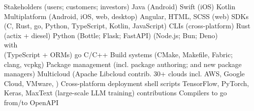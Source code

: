 \documentclass[11pt, a4paper]{article}
\begin{document}
\begin{minipage}[t]{0.56\textwidth}
\begin{tcbitemize}[raster columns=1, outerbox, 
    raster row skip=2pt]
    \tcbitem[colback=mybluei!40] 
        \begin{tcbitemize}[raster columns=6, raster rows=5, 
            raster equal height=all, 
            raster row skip=1pt, 
            raster column skip=1pt, 
            title style={left color=yellow!50!blue,right color=blue!50!green!50!black},
            innerbox]
            \tcbitem[raster multicolumn=6, colframe=blue!50!green!50!black, colback=blue!50!green!50!black, height=1cm] Stakeholders (users; customers; investors)
            \tcbitem Java (\mbox{Android})
            \tcbitem Swift (iOS)
            \tcbitem Kotlin Multiplatform (Android, iOS, web, desktop)
            \tcbitem Angular, HTML, SCSS (web)
            \tcbitem SDKs (C, Rust, go, Python, TypeScript, Kotlin, JavaScript)
            \tcbitem CLIs (cross-platform)
            \tcbitem[colback=myorange] Rust (actix + diesel)
            \tcbitem[colback=myorange] Python (Bottle; Flask; FastAPI)
            \tcbitem[raster multicolumn=2, colback=myorange] (Node.js; Bun; Deno)\\with\\(TypeScript + ORMs)
            \tcbitem[colback=myorange] go
            \tcbitem[colback=myorange] C/C++
            \tcbitem[colback=purple]Build systems (CMake, Makefile, Fabric; clang, vcpkg)
            \tcbitem[raster multicolumn=2, colback=purple] Package management (incl. package authoring; and new package managers)
            \tcbitem[raster multicolumn=2, colback=purple] Multicloud (Apache Libcloud contrib. 30+ clouds incl. AWS, Google Cloud, VMware, \textellipsis{})
            \tcbitem[colback=purple] Cross-platform deployment shell scripts
            \tcbitem[raster multicolumn=3,colback=darkpink] TensorFlow, PyTorch, Keras, MaxText (large-scale LLM training) contributions
            \tcbitem[raster multicolumn=3, colback=mygreen!140] Compilers to go from/to OpenAPI
        \end{tcbitemize}
\end{tcbitemize}

\end{minipage}
\end{document}
